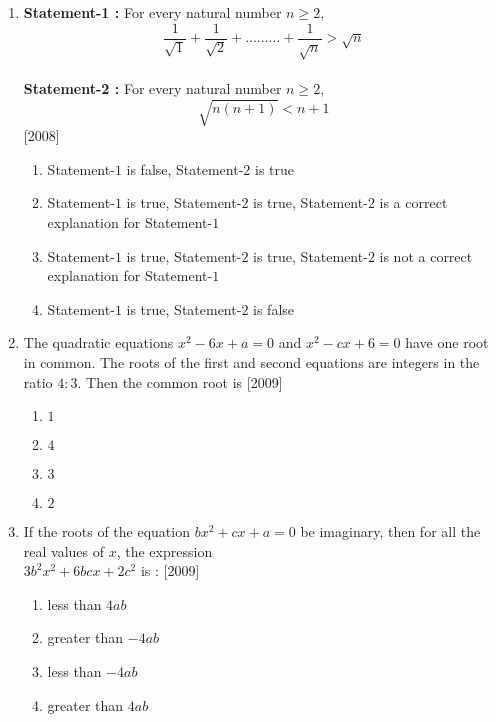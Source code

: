 \documentclass[journal,12pt,twocolumn]{IEEEtran}
\theoremstyle{remark}
\begin{document}
\begin{enumerate}
\begin{enumerate}
\end{enumerate}

\item \textbf{Statement-1 :} For every natural number $n\geq 2$,\\
$$\frac{1}{\sqrt{1}} + \frac{1}{\sqrt{2}} + ......... + \frac{1}{\sqrt{n}} > \sqrt{n}$$\\
\textbf{Statement-2 :} For every natural number $n\geq 2$,\\
$$\sqrt{n(n + 1)} < n + 1$$
\hfill[2008]\\

\begin{enumerate}

	\item  Statement-$1$ is false, Statement-$2$ is true
	\item  Statement-$1$ is true, Statement-$2$ is true, Statement-$2$ is a correct explanation for Statement-$1$
	\item  Statement-$1$ is true, Statement-$2$ is true, Statement-$2$ is not a correct explanation for Statement-$1$
	\item  Statement-$1$ is true, Statement-$2$ is false

\end{enumerate}

\item The quadratic equations $x^2 - 6x + a = 0$ and $x^2 - cx + 6 = 0$ have one root in common. The roots of the first and second equations are integers in the ratio $4 : 3$. Then the common root is
\hfill[2009]

\begin{enumerate}

	\item  $1$
	\item  $4$
	\item  $3$
	\item  $2$

\end{enumerate}

\item If the roots of the equation $bx^2 + cx + a = 0$ be imaginary, then for all the real values of $x$, the expression\\
$3b^2x^2 + 6bcx + 2c^2$ is :
\hfill[2009]

\begin{enumerate}

	\item  less than $4ab$
	\item  greater than $-4ab$
	\item  less than $-4ab$
	\item  greater than $4ab$


\end{enumerate}
\end{enumerate}
\end{document}
